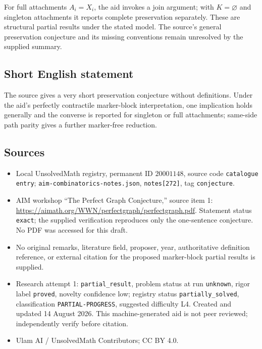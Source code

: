 \documentclass[11pt]{article}
\begin{document}
For full attachments \(A_i=X_i\), the aid invokes a join argument; with \(K=\varnothing\) and singleton attachments it reports complete preservation separately. These are structural partial results under the stated model. The source's general preservation conjecture and its missing conventions remain unresolved by the supplied summary.
\subsection{Short English statement}
The source gives a very short preservation conjecture without definitions. Under the aid's perfectly contractile marker-block interpretation, one implication holds generally and the converse is reported for singleton or full attachments; same-side path parity gives a further marker-free reduction.
\subsection{Sources}
\begin{itemize}
\item Local UnsolvedMath registry, permanent ID \(20001148\), source code \texttt{catalogue entry}; \texttt{aim-combinatorics-notes.json}, \texttt{notes[272]}, tag \texttt{conjecture}.
\item AIM workshop ``The Perfect Graph Conjecture,'' source item 1: \url{https://aimath.org/WWN/perfectgraph/perfectgraph.pdf}. Statement status \texttt{exact}; the supplied verification reproduces only the one-sentence conjecture. No PDF was accessed for this draft.
\item No original remarks, literature field, proposer, year, authoritative definition reference, or external citation for the proposed marker-block partial results is supplied.
\item Research attempt 1: \texttt{partial\_result}, problem status at run \texttt{unknown}, rigor label \texttt{proved}, novelty confidence low; registry status \texttt{partially\_solved}, classification \texttt{PARTIAL-PROGRESS}, suggested difficulty L4. Created and updated 14 August 2026. This machine-generated aid is not peer reviewed; independently verify before citation.
\item Ulam AI / UnsolvedMath Contributors; CC BY 4.0.
\end{itemize}
\end{document}
